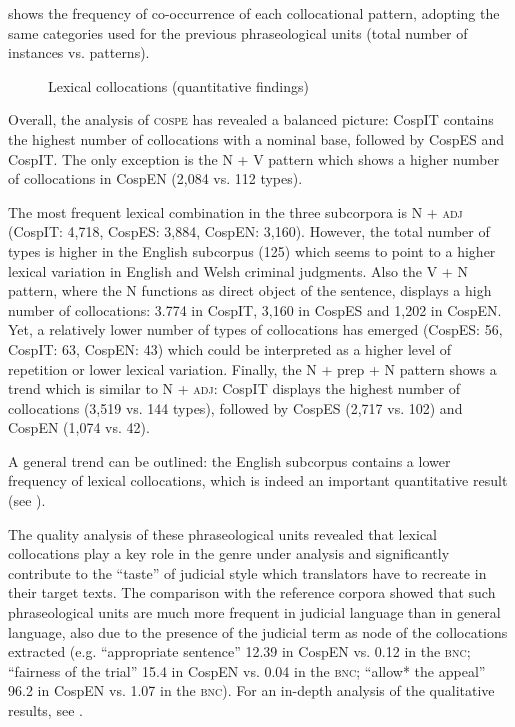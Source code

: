 \documentclass[output=paper]{LSP/langsci}
\begin{document}
 shows the frequency of co-occurrence of each collocational pattern, adopting the same categories used for the previous phraseological units (total number of instances vs. patterns).

\begin{figure}

\caption{Lexical collocations (quantitative findings)} \label{fig:6:3}
\end{figure}

Overall, the analysis of \textsc{cospe} has revealed a balanced picture: CospIT contains the highest number of collocations with a nominal base, followed by CospES and CospIT. The only exception is the N + V pattern which shows a higher number of collocations in CospEN (2,084 vs. 112 types).

The most frequent lexical combination in the three subcorpora is N + \textsc{adj} (CospIT: 4,718, CospES: 3,884, CospEN: 3,160). However, the total number of types is higher in the English subcorpus (125) which seems to point to a higher lexical variation in English and Welsh criminal judgments. Also the V + N pattern, where the N functions as direct object of the sentence, displays a high number of collocations: 3.774 in CospIT, 3,160 in CospES and 1,202 in CospEN. Yet, a relatively lower number of types of collocations has emerged (CospES: 56, CospIT: 63, CospEN: 43) which could be interpreted as a higher level of repetition or lower lexical variation. Finally, the N + prep + N pattern shows a trend which is similar to N + \textsc{adj}: CospIT displays the highest number of collocations (3,519 vs. 144 types), followed by CospES (2,717 vs. 102) and CospEN (1,074 vs. 42).

A general trend can be outlined: the English subcorpus contains a lower frequency of lexical collocations, which is indeed an important quantitative result (see ).

The quality analysis of these phraseological units revealed that lexical collocations play a key role in the genre under analysis and significantly contribute to the “taste” of judicial style which translators have to recreate in their target texts. The comparison with the reference corpora showed that such phraseological units are much more frequent in judicial language than in general language, also due to the presence of the judicial term as node of the collocations extracted (e.g. “appropriate sentence” 12.39 in CospEN vs. 0.12 in the \textsc{bnc}; “fairness of the trial” 15.4 in CospEN vs. 0.04 in the \textsc{bnc}; “allow* the appeal” 96.2 in CospEN vs. 1.07 in the \textsc{bnc}). For an in-depth analysis of the qualitative results, see \citep[241--252][]{Pontrandolfo2013a}.
\end{document}
